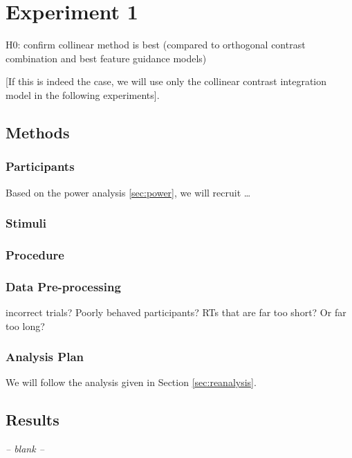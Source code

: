 \documentclass[smallextended]{svjour3}       %
\begin{document}
\section{Experiment 1}

H0: confirm collinear method is best (compared to orthogonal contrast combination and best feature guidance models)

[If this is indeed the case, we will use only the collinear contrast integration model in the following experiments].

\subsection{Methods}

\subsubsection{Participants}

Based on the power analysis \ref{sec:power}, we will recruit \ldots

\subsubsection{Stimuli}

\subsubsection{Procedure}

\subsubsection{Data Pre-processing}

incorrect trials? Poorly behaved participants? RTs that are far too short? Or far too long?

\subsubsection{Analysis Plan}

We will follow the analysis given in Section \ref{sec:reanalysis}.

\subsection{Results}
\begin{center}
\textit{-- blank --}
\end{center}
\end{document}
